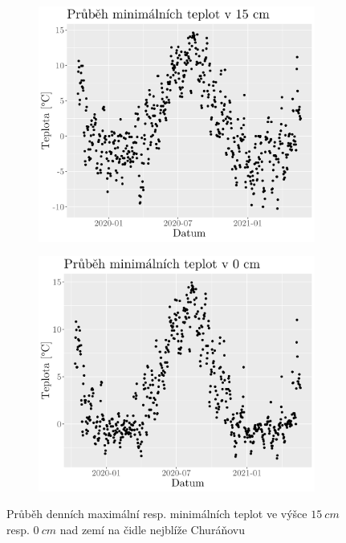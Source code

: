 \begin{figure}
	\hfill
	\begin{subfigure}{0.45\textwidth}
  \includegraphics[width=\textwidth]{img/maxtempmin15cm.png}
		\caption{}
		\label{fig:maxtempmin15cm}
	\end{subfigure}
	\hfill
	\begin{subfigure}{0.45\textwidth}
  \includegraphics[width=\textwidth]{img/maxtempmin0cm.png}
		\caption{}
		\label{fig:maxtempmin0cm}
	\end{subfigure}
	\caption{Průběh denních maximální resp. minimálních teplot ve výšce $\SI{15}{cm}$ resp. $\SI{0}{cm}$ nad zemí na čidle nejblíže Churáňovu}
	\label{fig:maxtemp}
\end{figure}

